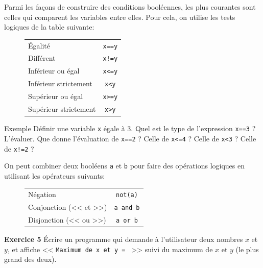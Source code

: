 \documentclass[10pt]{beamer}
\begin{document}
\begin{frame}[fragile]
	Parmi les façons de construire des conditions booléennes, les plus courantes sont celles qui comparent les variables entre elles. Pour cela, on utilise les tests logiques de la table suivante:
	\begin{figure}
	\centering
	\begin{tabular}{|l|c|}\hline
	Égalité & \verb|x==y| \\ 
	Différent & \verb|x!=y| \\ 
	Inférieur ou égal & \verb|x<=y| \\ 
	Inférieur strictement & \verb|x<y| \\ 
	Supérieur ou égal & \verb|x>=y| \\
	Supérieur strictement & \verb|x>y| \\ \hline
	\end{tabular}
	\end{figure}
	\pause
	
	\begin{block}{Exemple}
	Définir une variable \verb|x| égale à $3$. Quel est le type de l'expression \verb|x==3| ? L'évaluer. Que donne l'évaluation de \verb|x==2| ? Celle de \verb|x<=4| ? Celle de \verb|x<3| ? Celle de \verb|x!=2| ?
	\end{block}
	\pause
	
	On peut combiner deux booléens \verb|a| et \verb|b| pour faire des opérations logiques en utilisant les opérateurs suivants:
	\begin{figure}
	\centering
	\begin{tabular}{|l|c|}\hline
	Négation & \verb|not(a)| \\
	Conjonction (<< et >>) & \verb|a and b| \\
	Disjonction (<< ou >>) & \verb|a or b| \\ \hline
	\end{tabular}
	\end{figure}
\end{frame}

\begin{frame}[fragile]
	\begin{block}{\textbf{Exercice 5}}
		Écrire un programme qui demande à l'utilisateur deux nombres $x$ et $y$, et affiche << \verb|Maximum de x et y = | >> suivi du maximum de $x$ et $y$ (le plus grand des deux).
	\end{block}
\end{frame}
\end{document}
